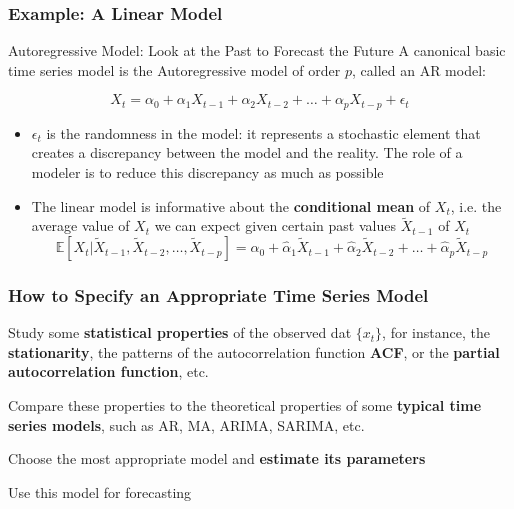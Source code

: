 \documentclass{beamer}
\newenvironment{wideenumerate}{\enumerate\addtolength{\itemsep}{10pt}}{\endenumerate}
\begin{document}
\begin{frame}
  \frametitle{Example: A Linear Model}

  \begin{exampleblock}{Autoregressive Model: Look at the Past to Forecast the Future}
    A canonical basic time series model is the Autoregressive model of order $p$, called an AR model:

    \begin{equation*}
      X_t = \alpha_0 + \alpha_1 X_{t-1} + \alpha_2 X_{t-2} + \dots + \alpha_p X_{t-p} + \epsilon_t
    \end{equation*}       
  \end{exampleblock}

  \medskip

  \begin{itemize}
  \item $\epsilon_t$ is the randomness in the model: it represents a stochastic element that creates a discrepancy between the model and the reality. The role of a modeler is to reduce this discrepancy as much as possible
  \item The linear model is informative about the \textbf{conditional mean} of $X_t$, i.e. the average value of $X_t$ we can expect given certain past values $\tilde{X}_{t-1}$ of $X_t$
    \begin{equation*}
      \mathbb{E}[X_t|\tilde{X}_{t-1}, \tilde{X}_{t-2}, \dots, \tilde{X}_{t-p}] = \hat{\alpha}_0 + \hat{\alpha}_1 \tilde{X}_{t-1} + \hat{\alpha}_2 \tilde{X}_{t-2} + \dots + \hat{\alpha}_p \tilde{X}_{t-p}  
    \end{equation*}    
  \end{itemize}
  
\end{frame}


\begin{frame}
  \frametitle{How to Specify an Appropriate Time Series Model}
  \begin{wideenumerate}
    \item Study some \textbf{statistical properties} of the observed dat $\{x_t\}$, for instance, the \textbf{stationarity}, the patterns of the autocorrelation function \textbf{ACF}, or the \textbf{partial autocorrelation function}, etc.
    \item Compare these properties to the theoretical properties of some \textbf{typical time series models}, such as AR, MA, ARIMA, SARIMA, etc.
    \item Choose the most appropriate model and \textbf{estimate its parameters}
    \item Use this model for forecasting
  \end{wideenumerate}
\end{frame}
\end{document}
